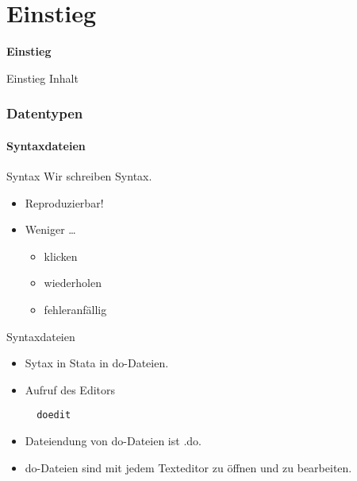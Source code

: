 \part{Einstieg}
\begin{frame}
\thispagestyle{empty}
\textbf{\huge{Einstieg}}
\end{frame}

\begin{frame}{Einstieg Inhalt}
 \tableofcontents
\end{frame}


\section{Datentypen}
\subsection{Syntaxdateien}
\begin{frame}[fragile]{Syntax}
 Wir schreiben Syntax.
 \begin{itemize}
  \item Reproduzierbar!
  \item Weniger \dots
  \begin{itemize}
   \item klicken
   \item wiederholen
   \item fehleranfällig
  \end{itemize}
 \end{itemize}
\end{frame}

\begin{frame}[fragile]{Syntaxdateien}
  \begin{itemize}
  \item Sytax in Stata in do-Dateien. 
  \item Aufruf des Editors 
  \begin{lstlisting}
  doedit
  \end{lstlisting}
  \item Dateiendung von do-Dateien ist .do.
  \item do-Dateien sind mit jedem Texteditor zu öffnen und zu bearbeiten.
  \end{itemize}
\end{frame}

